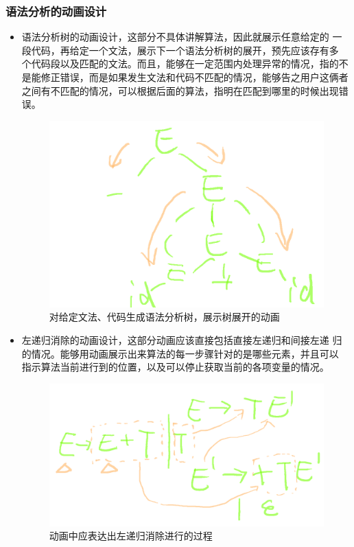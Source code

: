 \subsubsection{语法分析的动画设计}
\begin{itemize}
\item 语法分析树的动画设计，这部分不具体讲解算法，因此就展示任意给定的
  一段代码，再给定一个文法，展示下一个语法分析树的展开，预先应该存有多
  个代码段以及匹配的文法。而且，能够在一定范围内处理异常的情况，指的不
  是能修正错误，而是如果发生文法和代码不匹配的情况，能够告之用户这俩者
  之间有不匹配的情况，可以根据后面的算法，指明在匹配到哪里的时候出现错
  误。
          \begin{figure}[!htb]
          	\centering
          	\includegraphics[width=0.7\linewidth]{img/analyze.png}
          	\caption{对给定文法、代码生成语法分析树，展示树展开的动画}
          	\label{fig:analyze.png}
          \end{figure}
\item 左递归消除的动画设计，这部分动画应该直接包括直接左递归和间接左递
  归的情况。能够用动画展示出来算法的每一步骤针对的是哪些元素，并且可以
  指示算法当前进行到的位置，以及可以停止获取当前的各项变量的情况。
            \begin{figure}[!htb]
            	\centering
            	\includegraphics[width=0.7\linewidth]{img/leftrecursive.png}
            	\caption{动画中应表达出左递归消除进行的过程}
            	\label{fig:leftrecursive.png}

\end{figure}
\end{itemize}
